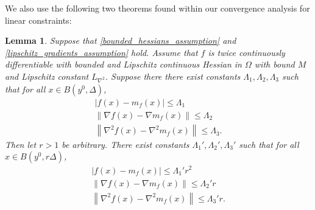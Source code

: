 \documentclass{article}
\newtheorem{lemma}[theorem]{Lemma}
\theoremstyle{case}
\numberwithin{theorem}{subsection}
\newcommand{\gradf}{\nabla f}
\newcommand{\liphess}{{L_{\nabla^2}}}
\begin{document}
We also use the following two theorems found within our convergence analysis for linear constraints:

\begin{lemma}
\label{change_radius} 
Suppose that \cref{bounded_hessians_assumption} and \cref{lipschitz_gradients_assumption} hold.
Assume that $f$ is twice continuously differentiable with bounded and Lipschitz continuous Hessian in $\Omega$ with bound $M$ and Lipschitz constant $\liphess$.
Suppose there there exist constants $\Lambda_1, \Lambda_2, \Lambda_3$ such that for all $x \in B\left(y^0, \Delta\right)$,
\begin{align*}
\left|f(x) - m_f(x)\right| \le \Lambda_1 \\ %
\left\|\gradf(x) - \nabla m_f(x)\right\| \le \Lambda_2 \\ %
\left\|\nabla^2 f(x) - \nabla^2 m_f(x)\right\| \le \Lambda_3. %
\end{align*}
Then let $r > 1$ be arbitrary.
There exist constants $\Lambda_1', \Lambda_2', \Lambda_3'$ such that for all $x \in B\left(y^0, r\Delta\right)$,
\begin{align*}
\left|f(x) - m_f(x)\right| \le \Lambda_1' r^2 \\ %
\left\|\gradf(x) - \nabla m_f(x)\right\| \le \Lambda_2' r\\ %
\left\|\nabla^2 f(x) - \nabla^2 m_f(x)\right\| \le \Lambda_3' r .%
\end{align*}
\end{lemma}
\end{document}
